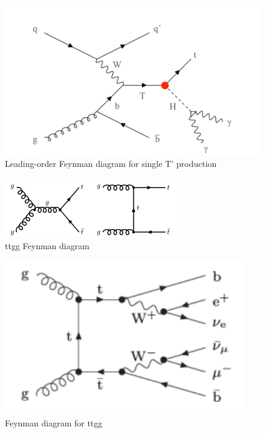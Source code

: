 \begin{figure}[H]
    \centering
    \includegraphics[scale=0.5]{figure_1/T'.png}
    \caption{Leading-order Feynman diagram for single T’ production}
    \label{fig:my_label_T'}
\end{figure}


\begin{figure}[H]
    \centering
    \includegraphics[scale=0.7]{figure_1/ttgg.png}
    \caption{ttgg Feynman diagram}
    \label{fig:my_label_ttgg}
\end{figure}

\begin{figure}[H]
    \centering
    \includegraphics[scale=1]{figure_1/ttgg__.pdf}
    \caption{Feynman diagram for ttgg}
    \label{fig:my_label_ttgg_12}
\end{figure}


